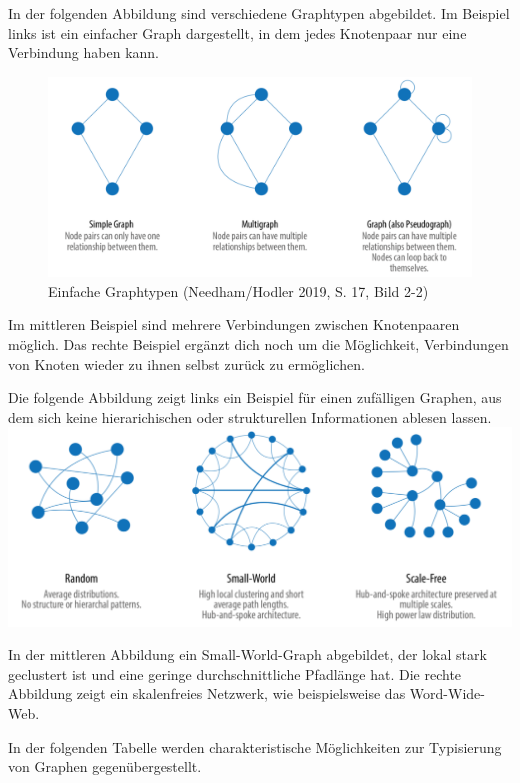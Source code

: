 In der folgenden Abbildung sind verschiedene Graphtypen abgebildet. Im
Beispiel links ist ein einfacher Graph dargestellt, in dem jedes
Knotenpaar nur eine Verbindung haben kann.

\begin{figure}
\centering
\includegraphics{Bilder/Graph-Algorithms/17-2-2-TypesOfGraphs.png}
\caption{Einfache Graphtypen (Needham/Hodler 2019, S. 17, Bild 2-2)}
\end{figure}

Im mittleren Beispiel sind mehrere Verbindungen zwischen Knotenpaaren
möglich. Das rechte Beispiel ergänzt dich noch um die Möglichkeit,
Verbindungen von Knoten wieder zu ihnen selbst zurück zu ermöglichen.

Die folgende Abbildung zeigt links ein Beispiel für einen zufälligen
Graphen, aus dem sich keine hierarichischen oder strukturellen
Informationen ablesen lassen.
\includegraphics{Bilder/Graph-Algorithms/17-2-3-RandomSmallWorldScaleFree.png}

In der mittleren Abbildung ein Small-World-Graph abgebildet, der lokal
stark geclustert ist und eine geringe durchschnittliche Pfadlänge hat.
Die rechte Abbildung zeigt ein skalenfreies Netzwerk, wie beispielsweise
das Word-Wide-Web.

In der folgenden Tabelle werden charakteristische Möglichkeiten zur
Typisierung von Graphen gegenübergestellt.

